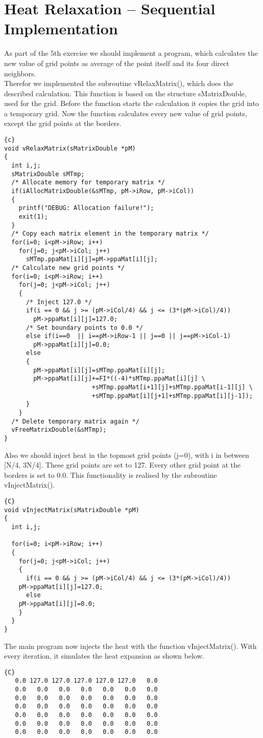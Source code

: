 \documentclass{article}
\newcommand{\enterProblemHeader}[1]{
}
\newcommand{\exitProblemHeader}[1]{
}
\newcounter{homeworkProblemCounter} %
\newcommand{\homeworkProblemName}{}
\newenvironment{homeworkProblem}[1][Problem \arabic{homeworkProblemCounter}]{ %
\stepcounter{homeworkProblemCounter} %
\renewcommand{\homeworkProblemName}{#1} %
\section{\homeworkProblemName} %
}{
}
\begin{document}
\begin{homeworkProblem}[Heat Relaxation – Sequential Implementation]
As part of the 5th exercise we should implement a program, which calculates the new 
value of grid points as average of the point itself and its four direct neighbors.
\\
Therefor we implemented the subroutine vRelaxMatrix(), which does the described
calculation. This function is based on the structure sMatrixDouble, used for the grid.
Before the function starts the calculation it copies the grid into a temporary grid.
Now the function calculates every new value of grid points, except the grid points
at the borders.
\begin{lstlisting}{c}
void vRelaxMatrix(sMatrixDouble *pM)
{
  int i,j;
  sMatrixDouble sMTmp;
  /* Allocate memory for temporary matrix */
  if(iAllocMatrixDouble(&sMTmp, pM->iRow, pM->iCol))
  {
    printf("DEBUG: Allocation failure!");
    exit(1);
  }
  /* Copy each matrix element in the temporary matrix */
  for(i=0; i<pM->iRow; i++)
    for(j=0; j<pM->iCol; j++)
      sMTmp.ppaMat[i][j]=pM->ppaMat[i][j];
  /* Calculate new grid points */
  for(i=0; i<pM->iRow; i++)
    for(j=0; j<pM->iCol; j++)
    {
      /* Inject 127.0 */
      if(i == 0 && j >= (pM->iCol/4) && j <= (3*(pM->iCol)/4))
        pM->ppaMat[i][j]=127.0;
      /* Set boundary points to 0.0 */
      else if(i==0  || i==pM->iRow-1 || j==0 || j==pM->iCol-1)
        pM->ppaMat[i][j]=0.0;
      else
      {
        pM->ppaMat[i][j]=sMTmp.ppaMat[i][j];
        pM->ppaMat[i][j]+=FI*((-4)*sMTmp.ppaMat[i][j] \
                        +sMTmp.ppaMat[i+1][j]+sMTmp.ppaMat[i-1][j] \
                        +sMTmp.ppaMat[i][j+1]+sMTmp.ppaMat[i][j-1]);
      }
    }
  /* Delete temporary matrix again */
  vFreeMatrixDouble(&sMTmp);
}
\end{lstlisting}
Also we should inject heat in the topmost grid points (j=0), with i in between
[N/4, 3N/4]. These grid points are set to 127. Every other grid point at the
borders is set to 0.0. This functionality is realised by the subroutine vInjectMatrix().
\begin{lstlisting}{C}
void vInjectMatrix(sMatrixDouble *pM)
{
  int i,j;
  
  for(i=0; i<pM->iRow; i++)
  {
    for(j=0; j<pM->iCol; j++)
    {
      if(i == 0 && j >= (pM->iCol/4) && j <= (3*(pM->iCol)/4))
	pM->ppaMat[i][j]=127.0;
      else
	pM->ppaMat[i][j]=0.0;
    }
  }
}
\end{lstlisting}
The main program now injects the heat with the function vInjectMatrix(). With every
iteration, it simulates the heat expansion as shown below.
\begin{lstlisting}{C}
   0.0 127.0 127.0 127.0 127.0 127.0   0.0
   0.0   0.0   0.0   0.0   0.0   0.0   0.0
   0.0   0.0   0.0   0.0   0.0   0.0   0.0
   0.0   0.0   0.0   0.0   0.0   0.0   0.0
   0.0   0.0   0.0   0.0   0.0   0.0   0.0
   0.0   0.0   0.0   0.0   0.0   0.0   0.0
   0.0   0.0   0.0   0.0   0.0   0.0   0.0


\end{lstlisting}
\end{homeworkProblem}
\end{document}
